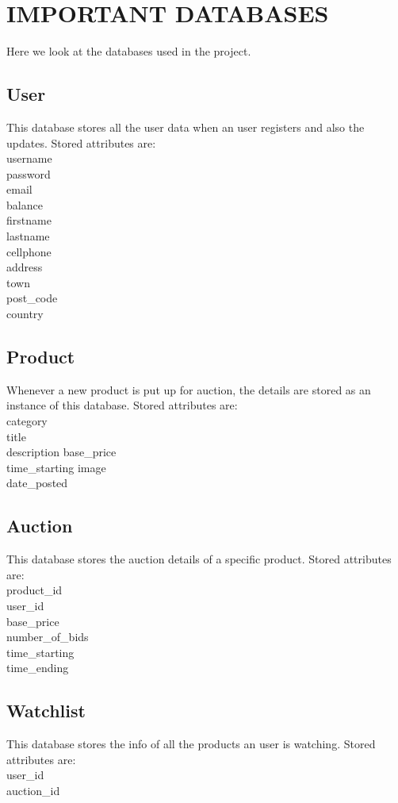 \documentclass[12pt]{article}
\begin{document}
\section{IMPORTANT DATABASES}
Here we look at the databases used in the project.

\subsection{User}
This database stores all the user data when an user registers and also the updates. Stored attributes are:\\
username\\
	password\\
	email\\
	balance\\
	firstname\\
	lastname\\
	cellphone\\
	address\\
	town\\
	post\_code\\
	country\\

\subsection{Product}
Whenever a new product is put up for auction, the details are stored as an instance of this database. Stored attributes are:\\
category\\
title\\
	description
	base\_price\\
	time\_starting
	image\\
	date\_posted\\

\subsection{Auction}
This database stores the auction details of a specific product. Stored attributes are:\\
product\_id\\
	user\_id\\
	base\_price\\
	number\_of\_bids\\
	time\_starting\\
	time\_ending\\

\subsection{Watchlist}
This database stores the info of all the products an user is watching. Stored attributes are:\\
user\_id\\
	auction\_id\\
\end{document}
